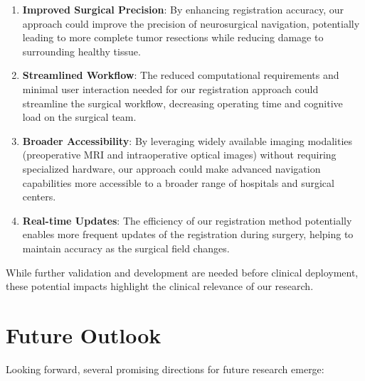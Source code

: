 \begin{enumerate}
    \item \textbf{Improved Surgical Precision}: By enhancing registration accuracy, our approach could improve the precision of neurosurgical navigation, potentially leading to more complete tumor resections while reducing damage to surrounding healthy tissue.
    
    \item \textbf{Streamlined Workflow}: The reduced computational requirements and minimal user interaction needed for our registration approach could streamline the surgical workflow, decreasing operating time and cognitive load on the surgical team.
    
    \item \textbf{Broader Accessibility}: By leveraging widely available imaging modalities (preoperative MRI and intraoperative optical images) without requiring specialized hardware, our approach could make advanced navigation capabilities more accessible to a broader range of hospitals and surgical centers.
    
    \item \textbf{Real-time Updates}: The efficiency of our registration method potentially enables more frequent updates of the registration during surgery, helping to maintain accuracy as the surgical field changes.
\end{enumerate}

While further validation and development are needed before clinical deployment, these potential impacts highlight the clinical relevance of our research.

\section{Future Outlook}

Looking forward, several promising directions for future research emerge:

